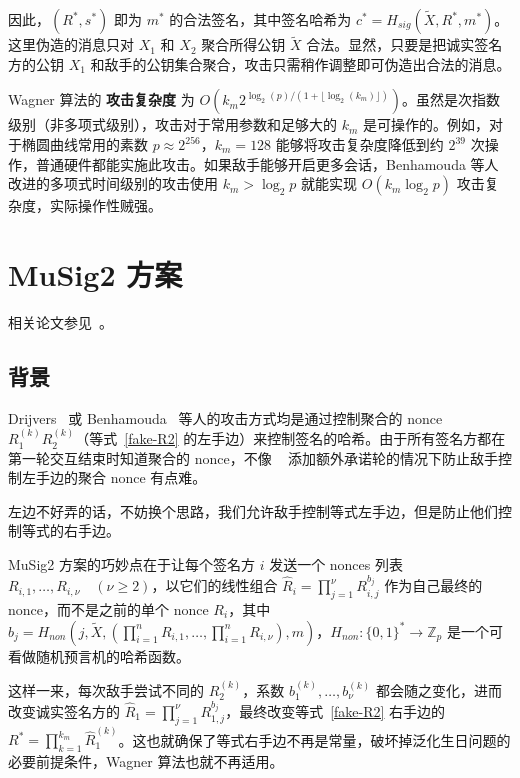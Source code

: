 \documentclass[a4paper,10pt]{article}
\newcommand{\bZ}{\mathbb{Z}}
\begin{document}
因此，\((R^*,s^*)\) 即为 \(m^*\) 的合法签名，其中签名哈希为 \(c^* = H_{sig}(\tilde{X},R^*,m^*)\)。
这里伪造的消息只对 \(X_1\) 和 \(X_2\) 聚合所得公钥 \(\tilde{X}\) 合法。显然，只要是把诚实签名方的公钥 \(X_1\) 和敌手的公钥集合聚合，攻击只需稍作调整即可伪造出合法的消息。

Wagner 算法的 \textbf{攻击复杂度} 为 \(O(k_m 2^{\log_2(p)/(1+\lfloor \log_2(k_m) \rfloor)})\)。虽然是次指数级别（非多项式级别），攻击对于常用参数和足够大的 \(k_m\) 是可操作的。例如，对于椭圆曲线常用的素数 \(p\approx 2^{256}\)，\(k_m=128\) 能够将攻击复杂度降低到约 \(2^{39}\) 次操作，普通硬件都能实施此攻击。如果敌手能够开启更多会话，Benhamouda 等人~\cite{cryptoeprint:2020:945} 改进的多项式时间级别的攻击使用 \(k_m>\log_2 p\) 就能实现 \(O(k_m\log_2 p)\) 攻击复杂度，实际操作性贼强。

\section{MuSig2 方案}

相关论文参见~\cite{cryptoeprint:2020:1261,jonasnick2020MuSig2}。

\subsection{背景}
Drijvers~\cite{2019On} 或 Benhamouda~\cite{cryptoeprint:2020:945} 等人的攻击方式均是通过控制聚合的 nonce \(R_1^{(k)} R_2^{(k)}\)（等式~\ref{fake-R2} 的左手边）来控制签名的哈希。由于所有签名方都在第一轮交互结束时知道聚合的 nonce，不像 ~\cite{cryptoeprint:2018:068} 添加额外承诺轮的情况下防止敌手控制左手边的聚合 nonce 有点难。

左边不好弄的话，不妨换个思路，我们允许敌手控制等式左手边，但是防止他们控制等式的右手边。

MuSig2 方案的巧妙点在于让每个签名方 \(i\) 发送一个 nonces 列表 \(R_{i,1},\dots,R_{i,\nu}\quad (\nu\geq 2)\)，以它们的线性组合 \(\hat{R}_i=\prod_{j=1}^{\nu}R_{i,j}^{b_j}\) 作为自己最终的 nonce，而不是之前的单个 nonce \(R_i\)，其中 \( b_j=H_{non}(j,\tilde{X},(\prod_{i=1}^n R_{i,1},\dots,\prod_{i=1}^n R_{i,\nu}),m) \)，\(H_{non}: \{0,1\}^*\rightarrow \bZ_p\) 是一个可看做随机预言机的哈希函数。

这样一来，每次敌手尝试不同的 \(R_2^{(k)}\)，系数 \(b_1^{(k)},\dots,b_{\nu}^{(k)}\) 都会随之变化，进而改变诚实签名方的 \(\hat{R}_1=\prod_{j=1}^{\nu}R_{1,j}^{b_j}\)，最终改变等式~\eqref{fake-R2} 右手边的 \(R^*=\prod_{k=1}^{k_m} \hat{R}_1^{(k)}\)。这也就确保了等式右手边不再是常量，破坏掉泛化生日问题的必要前提条件，Wagner 算法也就不再适用。
\end{document}

